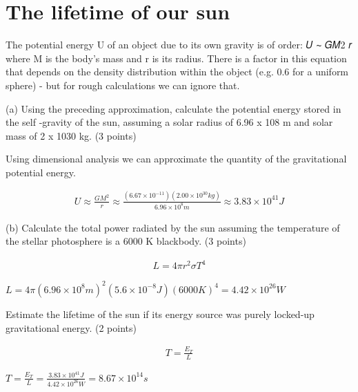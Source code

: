 \documentclass{article}
\begin{document}
\section{The lifetime of our sun}

The potential energy U of an object due to its own gravity is of order:
𝑈  ∼ 𝐺𝑀2 𝑟
where M is the body's mass and r is its radius. There is a factor in this equation that depends on the density distribution within the object (e.g. 0.6 for a uniform sphere) - but for rough calculations we can ignore that.

(a) Using the preceding approximation, calculate the potential energy stored in the self -gravity of the sun, assuming a solar radius of 6.96 x 108 m and solar mass of 2 x 1030 kg. (3 points)

Using dimensional analysis we can approximate the quantity of the gravitational potential energy.

\begin{gather*}
U \approx \frac{GM^2}{r} \approx \frac{(6.67\times10^{-11})(2.00\times10^{30}kg)}{6.96\times10^8m} \approx 3.83\times10^{41}J
\end{gather*}

(b) Calculate the total power radiated by the sun assuming the temperature of the stellar photosphere is a 6000 K blackbody. (3 points)


\begin{gather*}
	L = 4\pi r^2 \sigma T^4
\end{gather*}
\begin{center}
$\boxed{L = 4\pi(6.96\times10^8m)^2(5.6\times10^{-8}J)(6000K)^4 = 4.42\times10^{26}W}
$
\end{center}

Estimate the lifetime of the sun if its energy source was purely locked-up gravitational energy. (2 points)

\begin{gather*}
	T = \frac{E_T}{L}
\end{gather*}
\begin{center}
$\boxed{T = \frac{E_T}{L} = \frac{3.83\times10^{41}J}{4.42\times10^{26}W}=8.67\times10^{14}s}
$
\end{center}





	
\end{document}
